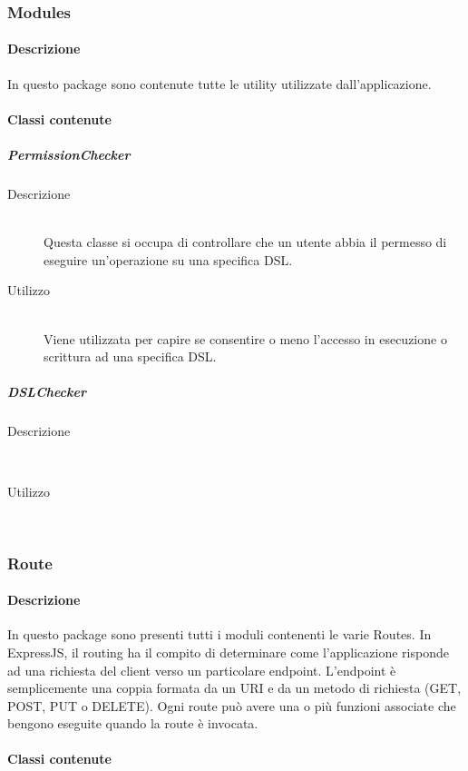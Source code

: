 \begin{description}
\subsubsection{Modules}
\paragraph{Descrizione}
In questo package sono contenute tutte le utility utilizzate dall'applicazione.
\paragraph{Classi contenute}
\subparagraph{PermissionChecker}
\begin{description}
\item[Descrizione] \hfill \\
Questa classe si occupa di controllare che un utente abbia il permesso di eseguire un'operazione su una specifica DSL.
\item[Utilizzo] \hfill \\
Viene utilizzata per capire se consentire o meno l'accesso in esecuzione o scrittura ad una specifica DSL.
\end{description}
\subparagraph{DSLChecker}
\begin{description}
\item[Descrizione] \hfill \\
\item[Utilizzo] \hfill \\
\end{description}

\subsubsection{Route}
\paragraph{Descrizione}
In questo package sono presenti tutti i moduli contenenti le varie Routes. In ExpressJS, il routing ha il compito di determinare come l'applicazione risponde ad una richiesta del client verso un particolare endpoint. L'endpoint è semplicemente una coppia formata da un URI e da un metodo di richiesta (GET, POST, PUT o DELETE). Ogni route può avere una o più funzioni associate che bengono eseguite quando la route è invocata.
\paragraph{Classi contenute}


\end{description}
